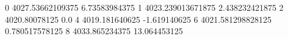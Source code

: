 0 4027.53662109375 6.73583984375
1 4023.239013671875 2.438232421875
2 4020.80078125 0.0
4 4019.181640625 -1.619140625
6 4021.581298828125 0.780517578125
8 4033.865234375 13.064453125
